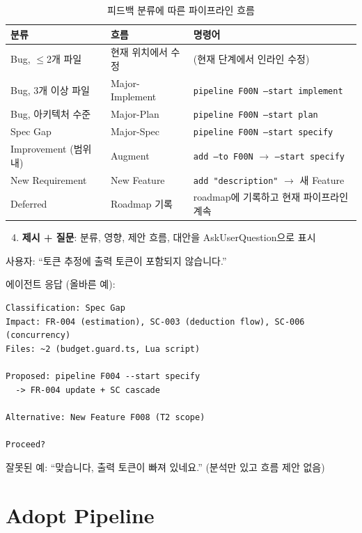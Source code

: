 \documentclass[11pt,a4paper,openright,twoside]{report}
\begin{document}
\begin{table}[H]
\centering
\caption{피드백 분류에 따른 파이프라인 흐름}
\begin{tabularx}{\textwidth}{llX}
\toprule
\textbf{분류} & \textbf{흐름} & \textbf{명령어} \\
\midrule
Bug, $\leq$2개 파일 & 현재 위치에서 수정 & (현재 단계에서 인라인 수정) \\
Bug, 3개 이상 파일 & Major-Implement & \texttt{pipeline F00N --start implement} \\
Bug, 아키텍처 수준 & Major-Plan & \texttt{pipeline F00N --start plan} \\
Spec Gap & Major-Spec & \texttt{pipeline F00N --start specify} \\
Improvement (범위 내) & Augment & \texttt{add --to F00N} $\rightarrow$ \texttt{--start specify} \\
New Requirement & New Feature & \texttt{add "description"} $\rightarrow$ 새 Feature \\
Deferred & Roadmap 기록 & roadmap에 기록하고 현재 파이프라인 계속 \\
\bottomrule
\end{tabularx}
\end{table}

\begin{enumerate}[nosep]
  \setcounter{enumi}{3}
  \item \textbf{제시 + 질문}: 분류, 영향, 제안 흐름, 대안을 AskUserQuestion으로 표시
\end{enumerate}

\begin{tipbox}
사용자: ``토큰 추정에 출력 토큰이 포함되지 않습니다.''

에이전트 응답 (올바른 예):
\begin{lstlisting}
Classification: Spec Gap
Impact: FR-004 (estimation), SC-003 (deduction flow), SC-006 (concurrency)
Files: ~2 (budget.guard.ts, Lua script)

Proposed: pipeline F004 --start specify
  -> FR-004 update + SC cascade

Alternative: New Feature F008 (T2 scope)

Proceed?
\end{lstlisting}

잘못된 예: ``맞습니다, 출력 토큰이 빠져 있네요.'' (분석만 있고 흐름 제안 없음)
\end{tipbox}

\section{Adopt Pipeline}
\end{document}
